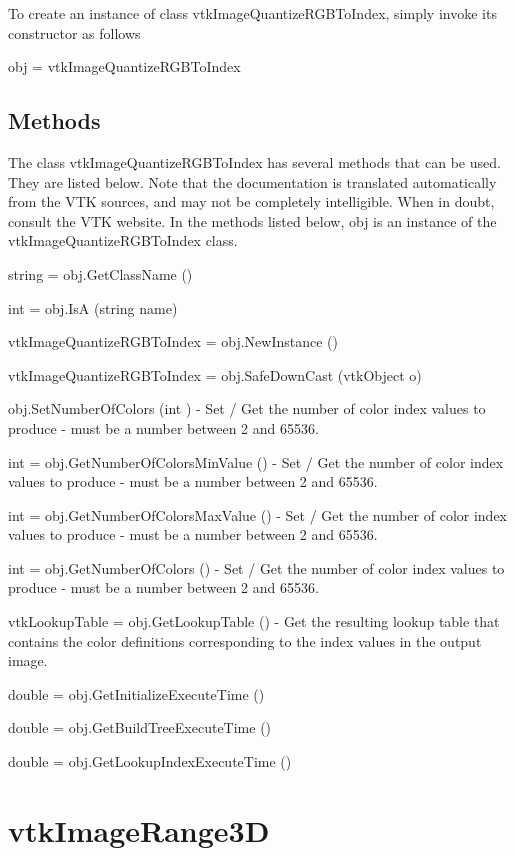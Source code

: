To create an instance of class vtk\-Image\-Quantize\-R\-G\-B\-To\-Index, simply invoke its constructor as follows \begin{DoxyVerb}  obj = vtkImageQuantizeRGBToIndex
\end{DoxyVerb}
 \hypertarget{vtkwidgets_vtkxyplotwidget_Methods}{}\subsection{Methods}\label{vtkwidgets_vtkxyplotwidget_Methods}
The class vtk\-Image\-Quantize\-R\-G\-B\-To\-Index has several methods that can be used. They are listed below. Note that the documentation is translated automatically from the V\-T\-K sources, and may not be completely intelligible. When in doubt, consult the V\-T\-K website. In the methods listed below, {\ttfamily obj} is an instance of the vtk\-Image\-Quantize\-R\-G\-B\-To\-Index class. 
\begin{DoxyItemize}
\item {\ttfamily string = obj.\-Get\-Class\-Name ()}  
\item {\ttfamily int = obj.\-Is\-A (string name)}  
\item {\ttfamily vtk\-Image\-Quantize\-R\-G\-B\-To\-Index = obj.\-New\-Instance ()}  
\item {\ttfamily vtk\-Image\-Quantize\-R\-G\-B\-To\-Index = obj.\-Safe\-Down\-Cast (vtk\-Object o)}  
\item {\ttfamily obj.\-Set\-Number\-Of\-Colors (int )} -\/ Set / Get the number of color index values to produce -\/ must be a number between 2 and 65536.  
\item {\ttfamily int = obj.\-Get\-Number\-Of\-Colors\-Min\-Value ()} -\/ Set / Get the number of color index values to produce -\/ must be a number between 2 and 65536.  
\item {\ttfamily int = obj.\-Get\-Number\-Of\-Colors\-Max\-Value ()} -\/ Set / Get the number of color index values to produce -\/ must be a number between 2 and 65536.  
\item {\ttfamily int = obj.\-Get\-Number\-Of\-Colors ()} -\/ Set / Get the number of color index values to produce -\/ must be a number between 2 and 65536.  
\item {\ttfamily vtk\-Lookup\-Table = obj.\-Get\-Lookup\-Table ()} -\/ Get the resulting lookup table that contains the color definitions corresponding to the index values in the output image.  
\item {\ttfamily double = obj.\-Get\-Initialize\-Execute\-Time ()}  
\item {\ttfamily double = obj.\-Get\-Build\-Tree\-Execute\-Time ()}  
\item {\ttfamily double = obj.\-Get\-Lookup\-Index\-Execute\-Time ()}  
\end{DoxyItemize}\hypertarget{vtkimaging_vtkimagerange3d}{}\section{vtk\-Image\-Range3\-D}\label{vtkimaging_vtkimagerange3d}

